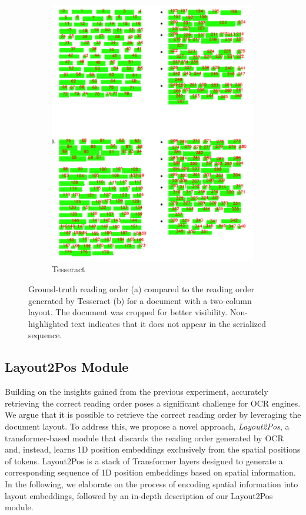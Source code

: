\begin{figure}
\begin{subfigure}[b]{0.5\textwidth}
        \includegraphics[width=\textwidth]{images/chapter4/tesseract_multicolumn.pdf}
        \caption{Tesseract}
      \end{subfigure}
    \caption{Ground-truth reading order (a) compared to the reading order generated by Tesseract (b) for a document with a two-column layout. The document was cropped for better visibility. Non-highlighted text indicates that it does not appear in the serialized sequence.}
    \label{fig:reading-orders-multicolumn}
\end{figure}


\subsection{Layout2Pos Module}

Building on the insights gained from the previous experiment, accurately retrieving the correct reading order poses a significant challenge for \ac{OCR} engines. We argue that it is possible to retrieve the correct reading order by leveraging the document layout. To address this, we propose a novel approach, \textit{Layout2Pos}, a transformer-based module that discards the reading order generated by \ac{OCR} and, instead, learns 1D position embeddings exclusively from the spatial positions of tokens. Layout2Pos is a stack of Transformer layers designed to generate a corresponding sequence of 1D position embeddings based on spatial information. In the following, we elaborate on the process of encoding spatial information into layout embeddings, followed by an in-depth description of our Layout2Pos module.

